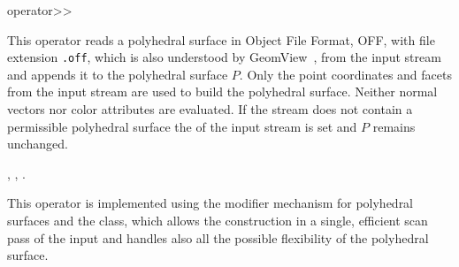 

\ccHtmlNoClassLinks
\begin{ccRefFunction}{operator>>}
\label{refPolyhedron_operator_rightshift}

\ccDefinition

This operator reads a polyhedral surface in Object File Format, OFF,
with file extension {\tt .off}, which is also understood by
GeomView~\cite{p-gmgv15-94}, from the input stream  and
appends it to the polyhedral surface $P$.  Only the point coordinates
and facets from the input stream are used to build the polyhedral
surface. Neither normal vectors nor color attributes are evaluated. If
the stream  does not contain a permissible polyhedral surface
the  of the input stream  is set and $P$ remains 
unchanged.


  
\ccSeeAlso

,
,
.

\ccImplementation

This operator is implemented using the modifier mechanism for
polyhedral surfaces and the 
class, which allows the construction in a single, efficient scan pass
of the input and handles also all the possible flexibility of the
polyhedral surface.


\end{ccRefFunction}


